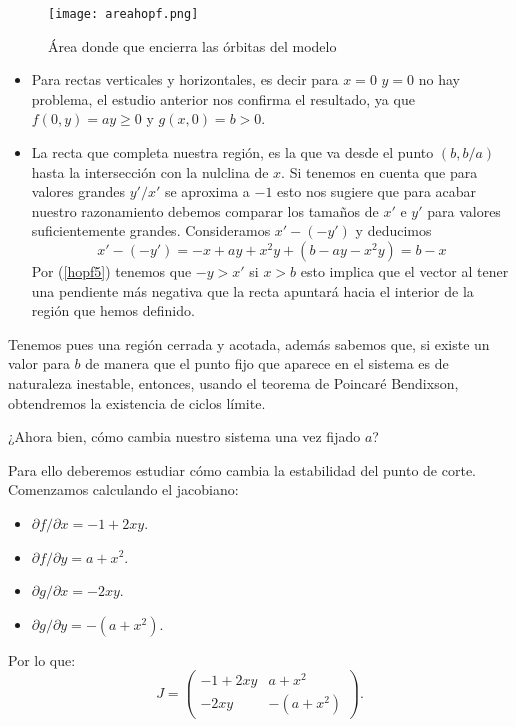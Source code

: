 \begin{figure}[H]
	\centering
	\texttt{[image: areahopf.png]}
	\caption{Área donde que encierra las órbitas del modelo }
\label{hopf8}
\end{figure}
\begin{itemize}
	\item Para rectas verticales y horizontales, es decir para $ x=0$ $y=0$ no hay problema, el estudio anterior nos confirma el resultado, ya que $f(0,y)=ay\geq0$ y $g(x,0)=b>0$.
	\item La recta que completa nuestra región, es la que va desde el punto $(b,b/a)$ hasta la intersección con la nulclina de $x$. Si tenemos en cuenta que para valores grandes $y'/x'$ se aproxima a  $-1$ esto nos sugiere que para acabar nuestro razonamiento debemos comparar los tamaños de $x'$ e $y'$ para valores suficientemente grandes. Consideramos $x'-(-y')$ y deducimos
	\begin{equation}
	x'-(-y')=-x+ay+x^2y+(b-ay-x^2y)=b-x
	\label{hopf5}
	\end{equation} 
	Por (\ref{hopf5}) tenemos que $-y>x'$ si $x>b$ esto implica que el vector al tener una pendiente más negativa que la recta apuntará hacia el interior de la región que hemos definido.
\end{itemize}
Tenemos pues una región cerrada y acotada, además sabemos que, si existe un valor para $b$ de manera que el punto fijo que aparece en el sistema es de naturaleza inestable, entonces, usando el teorema de Poincaré Bendixson, obtendremos la existencia de ciclos límite.

¿Ahora bien, cómo cambia nuestro sistema una vez fijado $a$?

Para ello deberemos estudiar cómo cambia la estabilidad del punto de corte. Comenzamos calculando el jacobiano:
\begin{itemize}
	\item $\partial f/\partial x=-1+2xy .$
	\item $\partial f/\partial y=a+x^2 .$
	\item $\partial g/\partial x=-2xy. $
	\item $\partial g/\partial y=-(a+x^2). $
\end{itemize}
Por lo que:
\begin{equation}
 J=\left( \begin{array}{ccc}
-1+2xy & a+x^2 \\
-2xy & -(a+x^2) \end{array} \right).
\end{equation}

